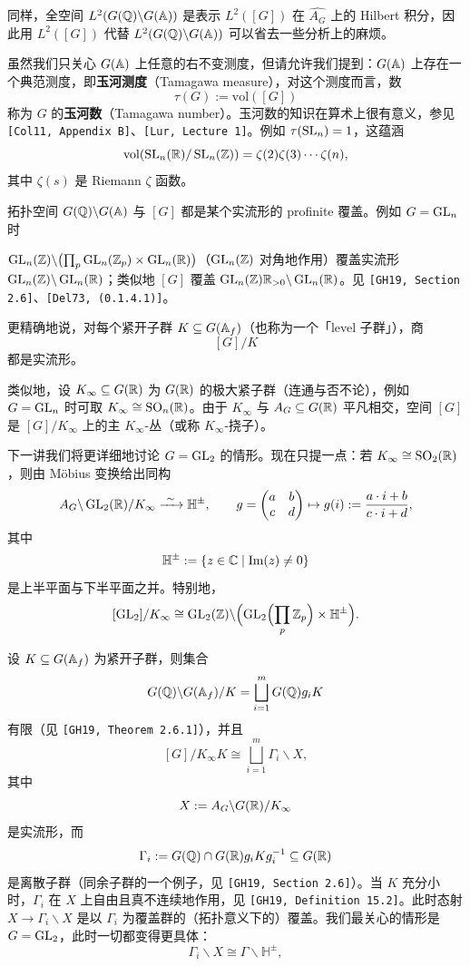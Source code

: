 同样，全空间 $L^2(G(\mathbb{Q})\backslash G(\mathbb{A}))$ 是表示 $L^2([G])$ 在 $\widehat{A_G}$ 上的 Hilbert 积分，因此用 $L^2([G])$ 代替 $L^2(G(\mathbb{Q})\backslash G(\mathbb{A}))$ 可以省去一些分析上的麻烦。

虽然我们只关心 $G(\mathbb{A})$ 上任意的右不变测度，但请允许我们提到：$G(\mathbb{A})$ 上存在一个典范测度，即\textbf{玉河测度}（Tamagawa measure），对这个测度而言，数
\[
\tau(G):=\mathrm{vol}([G])
\]
称为 $G$ 的\textbf{玉河数}（Tamagawa number）。玉河数的知识在算术上很有意义，参见 \texttt{[Col11, Appendix B]}、\texttt{[Lur, Lecture 1]}。例如 $\tau(\operatorname{SL}_n)=1$，这蕴涵
\[
\mathrm{vol}(\operatorname{SL}_n(\mathbb{R})/\operatorname{SL}_n(\mathbb{Z}))=\zeta(2)\zeta(3)\cdots\zeta(n),
\]
其中 $\zeta(s)$ 是 Riemann $\zeta$ 函数。

拓扑空间 $G(\mathbb{Q})\backslash G(\mathbb{A})$ 与 $[G]$ 都是某个实流形的 profinite 覆盖。例如 $G=\operatorname{GL}_n$ 时

$\operatorname{GL}_n(\mathbb{Z})\backslash\bigl(\prod_p\operatorname{GL}_n(\mathbb{Z}_p)\times\operatorname{GL}_n(\mathbb{R})\bigr)$（$\operatorname{GL}_n(\mathbb{Z})$ 对角地作用）覆盖实流形 $\operatorname{GL}_n(\mathbb{Z})\backslash\operatorname{GL}_n(\mathbb{R})$；类似地 $[G]$ 覆盖 $\operatorname{GL}_n(\mathbb{Z})\mathbb{R}_{>0}\backslash\operatorname{GL}_n(\mathbb{R})$。见 \texttt{[GH19, Section 2.6]}、\texttt{[Del73, (0.1.4.1)]}。

更精确地说，对每个紧开子群 $K\subseteq G(\mathbb{A}_f)$（也称为一个「level 子群」），商
\[
[G]/K
\]
都是实流形。

类似地，设 $K_\infty\subseteq G(\mathbb{R})$ 为 $G(\mathbb{R})$ 的极大紧子群（连通与否不论），例如 $G=\operatorname{GL}_n$ 时可取 $K_\infty\cong\operatorname{SO}_n(\mathbb{R})$。由于 $K_\infty$ 与 $A_G\subseteq G(\mathbb{R})$ 平凡相交，空间 $[G]$ 是 $[G]/K_\infty$ 上的主 $K_\infty$-丛（或称 $K_\infty$-挠子）。

下一讲我们将更详细地讨论 $G=\operatorname{GL}_2$ 的情形。现在只提一点：若 $K_\infty\cong\operatorname{SO}_2(\mathbb{R})$，则由 Möbius 变换给出同构
\[
A_G\backslash\GL_2(\R)/K_\infty\xrightarrow{\ \sim\ }\mathbb{H}^\pm,\qquad
g=\begin{pmatrix}a&b\\c&d\end{pmatrix}\mapsto g(i):=\frac{a\cdot i+b}{c\cdot i+d},
\]
其中
\[
\mathbb{H}^\pm:=\{z\in\mathbb{C}\mid \operatorname{Im}(z)\neq0\}
\]
是上半平面与下半平面之并。特别地，
\[
[\operatorname{GL}_2]/K_\infty\cong\operatorname{GL}_2(\mathbb{Z})\backslash\Bigl(\operatorname{GL}_2\Bigl(\prod_p\mathbb{Z}_p\Bigr)\times\mathbb{H}^\pm\Bigr).
\]

设 $K\subseteq G(\mathbb{A}_f)$ 为紧开子群，则集合
\[
G(\mathbb{Q})\backslash G(\mathbb{A}_f)/K=\bigsqcup_{i=1}^m G(\mathbb{Q})g_iK
\]
有限（见 \texttt{[GH19, Theorem 2.6.1]}），并且
\[
[G]/K_\infty K\cong\bigsqcup_{i=1}^m\Gamma_i\backslash X,
\]
其中
\[
X:=A_G\backslash G(\mathbb{R})/K_\infty
\]
是实流形，而
\[
\Gamma_i:=G(\mathbb{Q})\cap G(\mathbb{R})g_iKg_i^{-1}\subseteq G(\mathbb{R})
\]
是离散子群（同余子群的一个例子，见 \texttt{[GH19, Section 2.6]}）。当 $K$ 充分小时，$\Gamma_i$ 在 $X$ 上自由且真不连续地作用，见 \texttt{[GH19, Definition 15.2]}。此时态射 $X\to\Gamma_i\backslash X$ 是以 $\Gamma_i$ 为覆盖群的（拓扑意义下的）覆盖。我们最关心的情形是 $G=\operatorname{GL}_2$，此时一切都变得更具体：\[\Gamma_i\backslash X\cong\Gamma\backslash\mathbb{H}^\pm,\]

